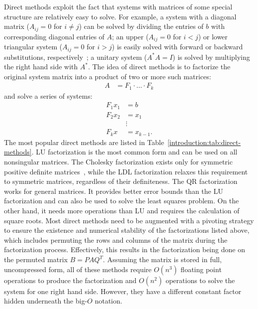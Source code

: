 Direct methods exploit the fact that systems with matrices of some special
structure are relatively easy to solve. For example, a system with a diagonal
matrix ($A_{ij} = 0$ for $i \neq j$) can be solved by dividing the entries of
$b$ with corresponding diagonal entries of $A$; an upper ($A_{ij} = 0$ for $i <
j$) or lower triangular system ($A_{ij} = 0$ for $i > j$) is easily solved with
forward or backward substitutions, respectively~\cite{demmel,Ipsen2009}; a
unitary system ($A^* A = I$) is solved by multiplying the right hand side with
$A^*$. The idea of direct methods is to factorize the original system matrix
into a product of two or more such matrices:
\begin{align}A &= F_1 \cdot \ldots \cdot F_k\end{align}
and solve a series of systems:
\begin{align}
    F_1 x_1 &= b\\
    F_2 x_2 &= x_1\\
    &\vdots \nonumber \\
    F_k x &= x_{k-1}.
\end{align}
The most popular direct methods are listed in
Table~\ref{introduction:tab:direct-methods}. LU factorization is the most common
form and can be used on all nonsingular matrices. The Cholesky factorization
exists only for symmetric positive definite matrices~\cite{demmel}, while the
LDL factorization relaxes this requirement to symmetric matrices, regardless of
their definiteness. The QR factorization works for general matrices. It provides
better error bounds than the LU factorization and can also be used to solve the
least squares problem\cite{demmel}. On the other hand, it needs more operations
than LU and requires the calculation of square roots. Most direct methods need
to be augmented with a pivoting strategy to ensure the existence and numerical
stability of the factorizations listed above, which includes permuting the rows
and columns of the matrix during the factorization process.  Effectively, this
results in the factorization being done on the permuted matrix $B = P A Q^T$.
Assuming the matrix is stored in full, uncompressed form, all of these methods
require $O(n^3)$ floating point operations to produce the factorization and
$O(n^2)$ operations to solve the system for one right hand side. However, they
have a different constant factor hidden underneath the big-$O$ notation.

